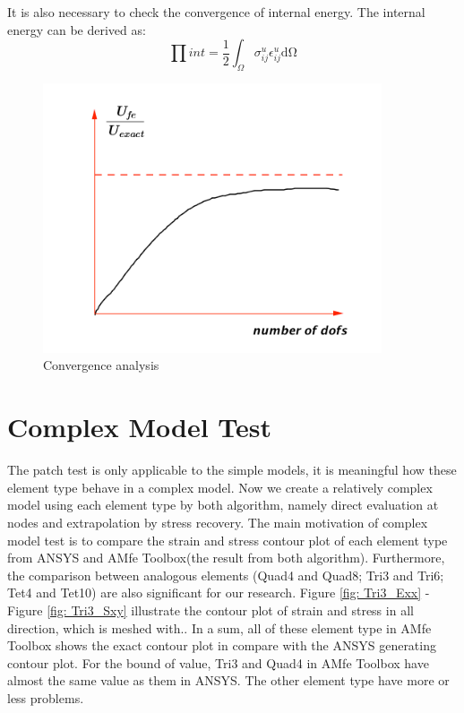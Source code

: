 It is also necessary to check the convergence of internal energy. The internal energy can be derived as:
\begin{equation}
\prod int = \frac{1}{2}\int_\Omega \sigma_{ij}^u\epsilon_{ij}^u \mathrm{d \Omega}
\end{equation}

\begin{figure}[htbp]
	\begin{center}	
		\includegraphics[width=10cm,clip]{convergence.pdf} 			
		\caption{Convergence analysis} \label{fig: convergence}
	\end{center}
\end{figure}


\section{Complex Model Test}
The patch test is only applicable to the simple models, it is meaningful how these element type behave in a complex model. Now we create a relatively complex model using each element type by both algorithm, namely direct evaluation at nodes and extrapolation by stress recovery. The main motivation of complex model test is to compare the strain and stress contour plot of each element type from ANSYS and AMfe Toolbox(the result from both algorithm). Furthermore, the comparison between analogous elements (Quad4 and Quad8; Tri3 and Tri6; Tet4 and Tet10) are also significant for our research. Figure \ref{fig: Tri3_Exx} - Figure \ref{fig: Tri3_Sxy} illustrate the contour plot of strain and stress in all direction, which is meshed with..  
In a sum, all of these element type in AMfe Toolbox shows the exact contour plot in compare with the ANSYS generating contour plot. For the bound of value, Tri3 and Quad4 in AMfe Toolbox have almost the same value as them in ANSYS. The other element type have more or less problems.

